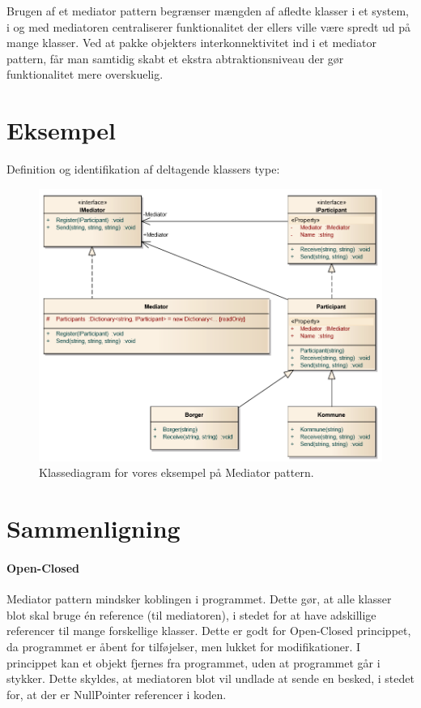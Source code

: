 Brugen af et mediator pattern begrænser mængden af afledte klasser i et system, i og med mediatoren centraliserer funktionalitet der ellers ville være spredt ud på mange klasser. Ved at pakke objekters interkonnektivitet ind i et mediator pattern, får man samtidig skabt et ekstra abtraktionsniveau der gør funktionalitet mere overskuelig.

\section{Eksempel}
Definition og identifikation af deltagende klassers type:

\begin{figure}[h]
	\centering
	\includegraphics[width=\linewidth]{figs/classdiagram}
	\caption{Klassediagram for vores eksempel på Mediator pattern.}
	\label{fig:mediclass}
\end{figure}

\section{Sammenligning}

\paragraph{Open-Closed}
Mediator pattern mindsker koblingen i programmet. Dette gør, at alle klasser blot skal bruge én reference (til mediatoren), i stedet for at have adskillige referencer til mange forskellige klasser. Dette er godt for Open-Closed princippet, da programmet er åbent for tilføjelser, men lukket for modifikationer. I princippet kan et objekt fjernes fra programmet, uden at programmet går i stykker. Dette skyldes, at mediatoren blot vil undlade at sende en besked, i stedet for, at der er NullPointer referencer i koden.

